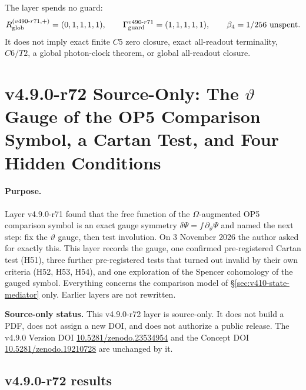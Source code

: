 The layer spends no guard:
\[
R_{\rm glob}^{(v490\text{-}r71,+)}=(0,1,1,1,1),
\qquad
\Gamma_{\rm guard}^{v490\text{-}r71}=(1,1,1,1,1),
\qquad
\beta_4=1/256\ \text{unspent}.
\]
It does not imply exact finite \(C5\) zero closure, exact all-readout terminality,
\(C6/T2\), a global photon-clock theorem, or global all-readout closure.

\clearpage
\section*{v4.9.0-r72 Source-Only: The \texorpdfstring{\(\vartheta\)}{theta} Gauge of the OP5 Comparison Symbol, a Cartan Test, and Four Hidden Conditions}
\label{sec:v490-r72-theta-gauge}

\paragraph{Purpose.}
Layer v4.9.0-r71 found that the free function of the \(\Omega\)-augmented OP5 comparison symbol is an exact gauge symmetry
\(\delta\Psi=f\,\partial_\vartheta\Psi\) and named the next step: fix the \(\vartheta\) gauge, then test involution.  On
3 November 2026 the author asked for exactly this.  This layer records the gauge, one confirmed pre-registered Cartan test
(H51), three further pre-registered tests that turned out invalid by their own criteria (H52, H53, H54), and one exploration of
the Spencer cohomology of the gauged symbol.  Everything concerns the comparison model of \S\ref{sec:v410-state-mediator}
only.  Earlier layers are not rewritten.

\noindent\textbf{Source-only status.}
This v4.9.0-r72 layer is source-only.  It does not build a PDF, does not assign a new DOI,
and does not authorize a public release.  The v4.9.0 Version DOI
\href{https://doi.org/10.5281/zenodo.23534954}{10.5281/zenodo.23534954} and the Concept DOI
\href{https://doi.org/10.5281/zenodo.19210728}{10.5281/zenodo.19210728} are unchanged by it.

\subsection*{v4.9.0-r72 results}
\label{subsec:v490-r72-results}

